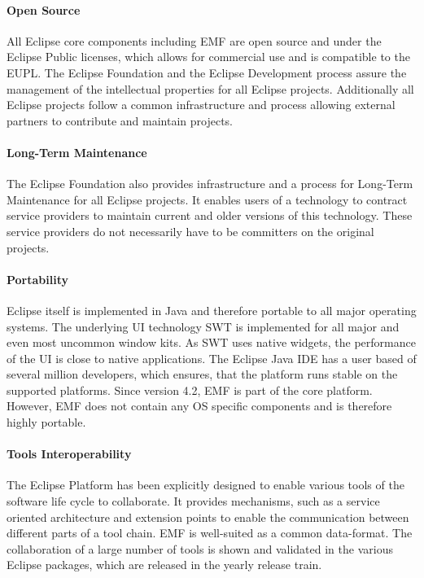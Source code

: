 \paragraph {Open Source}
All Eclipse core components including EMF are open source and under
the Eclipse Public licenses, which allows for commercial use and is
compatible to the EUPL. The Eclipse Foundation and the Eclipse
Development process assure the management of the intellectual
properties for all Eclipse projects. Additionally all Eclipse projects
follow a common infrastructure and process allowing external partners
to contribute and maintain projects. 

\paragraph{Long-Term Maintenance}
The Eclipse Foundation also provides infrastructure and a process for
Long-Term Maintenance for all Eclipse projects. It enables users of a
technology to contract service providers to maintain current and older
versions of this technology. These service providers do not
necessarily have to be committers on the original projects.

\paragraph{Portability}
Eclipse itself is implemented in Java and therefore portable to all
major operating systems. The underlying UI technology SWT is
implemented for all major and even most uncommon window kits. As SWT
uses native widgets, the performance of the UI is close to native
applications. The Eclipse Java IDE has a user based of several million
developers, which ensures, that the platform runs stable on the
supported platforms. Since version 4.2, EMF is part of the core
platform. However, EMF does not contain any OS specific components and
is therefore highly portable.

\paragraph{Tools Interoperability}
The Eclipse Platform has been explicitly designed to enable various
tools of the software life cycle to collaborate. It provides
mechanisms, such as a service oriented architecture and extension
points to enable the communication between different parts of a tool
chain. EMF is well-suited as a common data-format. The collaboration
of a large number of tools is shown and validated in the various
Eclipse packages, which are released in the yearly release train.


